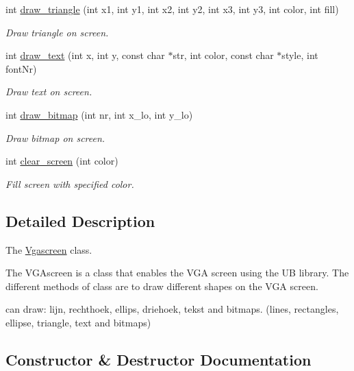 \begin{DoxyCompactItemize}
int \mbox{\hyperlink{class_vgascreen_ae7d7e2b13c8aee3181ebe96d1547663f}{draw\+\_\+triangle}} (int x1, int y1, int x2, int y2, int x3, int y3, int color, int fill)
\begin{DoxyCompactList}\small\item\em Draw triangle on screen. \end{DoxyCompactList}\item 
int \mbox{\hyperlink{class_vgascreen_a711cdaf1b83fafcea034f2c4a54ad872}{draw\+\_\+text}} (int x, int y, const char $\ast$str, int color, const char $\ast$style, int font\+Nr)
\begin{DoxyCompactList}\small\item\em Draw text on screen. \end{DoxyCompactList}\item 
int \mbox{\hyperlink{class_vgascreen_ad523b2dd47a6f2adde2d40cf1d809f27}{draw\+\_\+bitmap}} (int nr, int x\+\_\+lo, int y\+\_\+lo)
\begin{DoxyCompactList}\small\item\em Draw bitmap on screen. \end{DoxyCompactList}\item 
int \mbox{\hyperlink{class_vgascreen_a5420000fe45606af438d6de37cb59fa4}{clear\+\_\+screen}} (int color)
\begin{DoxyCompactList}\small\item\em Fill screen with specified color. \end{DoxyCompactList}\end{DoxyCompactItemize}


\subsection{Detailed Description}
The \mbox{\hyperlink{class_vgascreen}{Vgascreen}} class. 

The V\+G\+Ascreen is a class that enables the V\+GA screen using the UB library. The different methods of class are to draw different shapes on the V\+GA screen.

can draw\+: lijn, rechthoek, ellips, driehoek, tekst and bitmaps. (lines, rectangles, ellipse, triangle, text and bitmaps) 

\subsection{Constructor \& Destructor Documentation}
\mbox{\label{class_vgascreen_ad5914fac8c1af8491b92dfe780490191}} 

